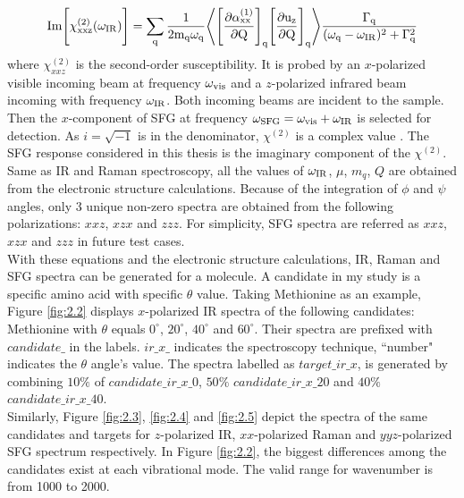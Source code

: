 \begin{equation} \label{eq:2.4}
\rm Im \Bigg\lbrack \chi^{(2)}_{xxz} (\omega_{\rm IR}) \Bigg\rbrack= \sum_{q} \frac{1}{2 m_{q} \omega_{\rm q}} \Bigg \langle \Bigg\lbrack \frac{\partial \alpha_{xx}^{(1)}}{\partial Q} \Bigg\rbrack_{q} \Bigg\lbrack \frac{\partial u_{z}}{\partial Q} \Bigg\rbrack_{q} \Bigg\rangle \frac{\Gamma_q}{(\omega_{\rm q}-\omega_{\rm IR})^{2}+\Gamma_q^{2}}
\end{equation} 
where $\chi^{(2)}_{xxz}$ is the second-order susceptibility. It is probed by an $x$-polarized visible incoming beam at frequency $\omega_{\rm vis}$ and a $z$-polarized infrared beam incoming with frequency $\omega_{\rm IR}$. Both incoming beams are incident to the sample. Then the $x$-component of SFG at frequency $\omega_{\rm SFG}=\omega_{\rm vis}+\omega_{\rm IR}$ is selected for detection. As $i=\sqrt{-1}$ is in the denominator, $\chi^{(2)}$ is a complex value \cite{KuoKaiHung:Thesis:2015}. The SFG response considered in this thesis is the imaginary component of the $\chi^{(2)}$. Same as IR and Raman spectroscopy, all the values of $\omega_{\rm IR}$, $\mu$, $m_q$, $Q$ are obtained from the electronic structure calculations. Because of the integration of $\phi$ and $\psi$ angles, only 3 unique non-zero spectra are obtained from the following polarizations: $xxz$, $xzx$ and $zzz$. For simplicity, SFG spectra are referred as $xxz$, $xzx$ and $zzz$ in future test cases. \\

With these equations and the electronic structure calculations, IR, Raman and SFG spectra can be generated for a molecule. A candidate in my study is a specific amino acid with specific $\theta$ value. Taking Methionine as an example, Figure \ref{fig:2.2} displays $x$-polarized IR spectra of the following candidates: Methionine with $\theta$ equals $0^{\circ}$, $20^{\circ}$, $40^{\circ}$ and $60^{\circ}$. Their spectra are prefixed with $candidate\_$ in the labels. $ir\_x\_$ indicates the spectroscopy technique, ``number" indicates the $\theta$ angle's value. The spectra labelled as $target\_ir\_x$, is generated by combining $10\%$ of $candidate\_ir\_x\_0$, $50\%$ $candidate\_ir\_x\_20$ and $40\%$ $candidate\_ir\_x\_40$. \\

Similarly, Figure \ref{fig:2.3}, \ref{fig:2.4} and \ref{fig:2.5} depict the spectra of the same candidates and targets for $z$-polarized IR, $xx$-polarized Raman and $yyz$-polarized SFG spectrum respectively. In Figure \ref{fig:2.2}, the biggest differences among the candidates exist at each vibrational mode. The valid range for wavenumber is from 1000 to 2000. \\

